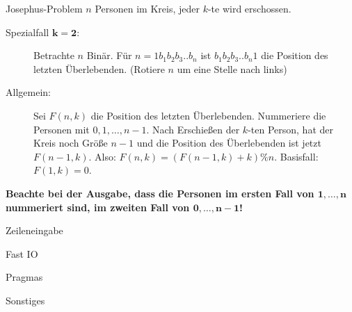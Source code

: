 \begin{algorithm}{Josephus-Problem}
	$n$ Personen im Kreis, jeder $k$-te wird erschossen.
	\begin{description}
		\item[Spezialfall $\boldsymbol{k=2}$:] Betrachte $n$ Binär.
		Für $n = 1b_1b_2b_3..b_n$ ist $b_1b_2b_3..b_n1$ die Position des letzten Überlebenden.
		(Rotiere $n$ um eine Stelle nach links)
	\end{description}
	
	\begin{description}
		\item[Allgemein:] Sei $F(n,k)$ die Position des letzten Überlebenden.
		Nummeriere die Personen mit $0, 1, \ldots, n-1$.
		Nach Erschießen der $k$-ten Person, hat der Kreis noch Größe $n-1$ und die Position des Überlebenden ist jetzt $F(n-1,k)$.
		Also: $F(n,k) = (F(n-1,k)+k)\%n$. Basisfall: $F(1,k) = 0$. 
	\end{description}
	
	\textbf{Beachte bei der Ausgabe, dass die Personen im ersten Fall von $\boldsymbol{1, \ldots, n}$ nummeriert sind, im zweiten Fall von $\boldsymbol{0, \ldots, n-1}$!}
\end{algorithm}

\begin{algorithm}[optional]{Zeileneingabe}
\end{algorithm}

\begin{algorithm}[optional]{Fast IO}
\end{algorithm}

\begin{algorithm}{Pragmas}
\end{algorithm}

\begin{algorithm}{Sonstiges}
\end{algorithm}

\clearpage

